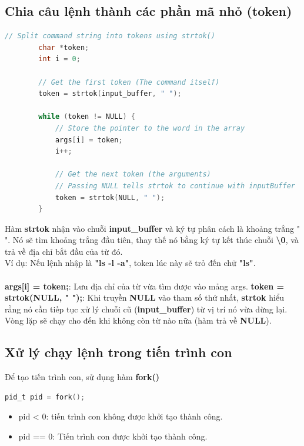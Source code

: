 \documentclass[12pt, letterpaper]{article}
\begin{document}
\subsection{Chia câu lệnh thành các phần mã nhỏ (token)}
\begin{lstlisting}[language=C, caption={logic chia lệnh thành các mã nhỏ (token)}]
    // Split command string into tokens using strtok()
        char *token;
        int i = 0;

        // Get the first token (The command itself)
        token = strtok(input_buffer, " ");

        while (token != NULL) {
            // Store the pointer to the word in the array
            args[i] = token; 
            i++;

            // Get the next token (the arguments)
            // Passing NULL tells strtok to continue with inputBuffer
            token = strtok(NULL, " ");
        }
\end{lstlisting}
Hàm \textbf{strtok} nhận vào chuỗi \textbf{input\_buffer} và ký tự phân cách là khoảng trắng " ".
Nó sẽ tìm khoảng trắng đầu tiên, thay thế nó bằng ký tự kết thúc chuỗi \textbf{\textbackslash 0}, và trả về địa chỉ bắt đầu của từ đó.\\
Ví dụ: Nếu lệnh nhập là \textbf{"ls -l -a"}, token lúc này sẽ trỏ đến chữ \textbf{"ls"}.\\\\
\textbf{args[i] = token;}: Lưu địa chỉ của từ vừa tìm được vào mảng args.
\textbf{token = strtok(NULL, " ");}: Khi truyền \textbf{NULL} vào tham số thứ nhất, \textbf{strtok} hiểu rằng nó cần tiếp tục xử lý chuỗi cũ (\textbf{input\_buffer}) từ vị trí nó vừa dừng lại.\\
Vòng lặp sẽ chạy cho đến khi không còn từ nào nữa (hàm trả về \textbf{NULL}).
\subsection{Xử lý chạy lệnh trong tiến trình con}
Để tạo tiến trình con, sử dụng hàm \textbf{fork()}
\begin{lstlisting}[language=C, caption={Sử dụng hàm fork() để tạo tiến trình con}]
    pid_t pid = fork();
\end{lstlisting}
\begin{itemize}
    \item pid < 0: tiến trình con không được khởi tạo thành công.
    \item pid == 0: Tiến trình con được khởi tạo thành công.
\end{itemize}
\end{document}
